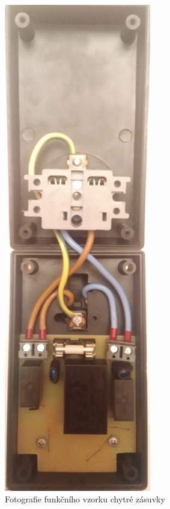 \documentclass[12pt,a4paper,oneside]{article}
\begin{document}
\begin{figure}[H]
\centering
\label{fig:foto/brana}
\includegraphics[width = 64mm]{img/foto/zasuvka.jpg}
\caption{Fotografie funkčního vzorku chytré zásuvky}
\end{figure}

\newpage

\printindex[zkr]


\newpage
\end{document}
